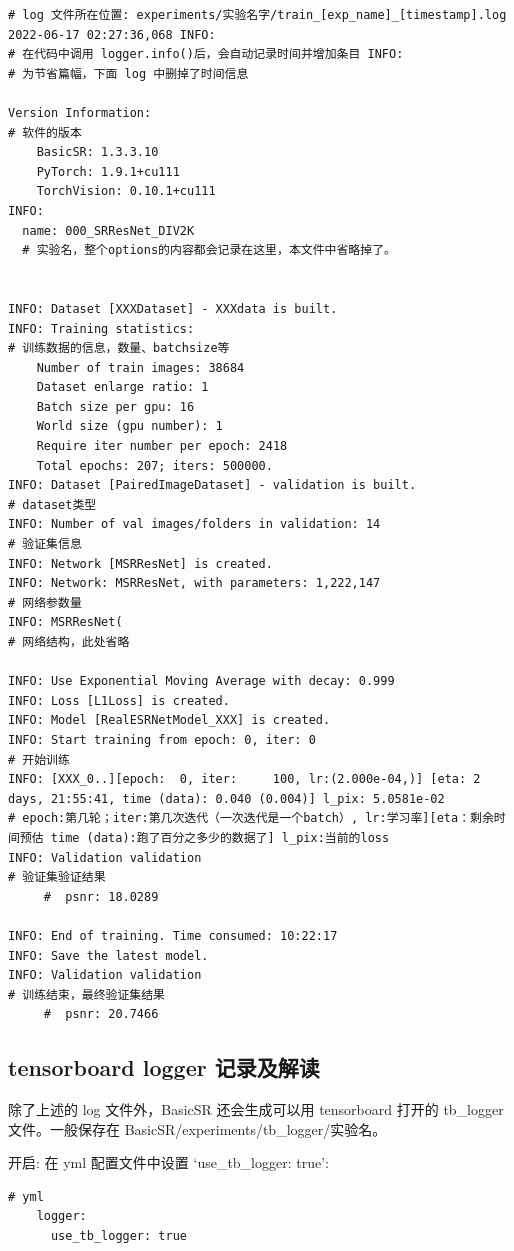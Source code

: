 \documentclass[../main.tex]{subfiles}
\begin{document}
\begin{verbatim}
# log 文件所在位置: experiments/实验名字/train_[exp_name]_[timestamp].log
2022-06-17 02:27:36,068 INFO:
# 在代码中调用 logger.info()后，会自动记录时间并增加条目 INFO:
# 为节省篇幅，下面 log 中删掉了时间信息

Version Information:
# 软件的版本
    BasicSR: 1.3.3.10
    PyTorch: 1.9.1+cu111
    TorchVision: 0.10.1+cu111
INFO:
  name: 000_SRResNet_DIV2K
  # 实验名，整个options的内容都会记录在这里，本文件中省略掉了。


INFO: Dataset [XXXDataset] - XXXdata is built.
INFO: Training statistics:
# 训练数据的信息，数量、batchsize等
    Number of train images: 38684
    Dataset enlarge ratio: 1
    Batch size per gpu: 16
    World size (gpu number): 1
    Require iter number per epoch: 2418
    Total epochs: 207; iters: 500000.
INFO: Dataset [PairedImageDataset] - validation is built.
# dataset类型
INFO: Number of val images/folders in validation: 14
# 验证集信息
INFO: Network [MSRResNet] is created.
INFO: Network: MSRResNet, with parameters: 1,222,147
# 网络参数量
INFO: MSRResNet(
# 网络结构，此处省略

INFO: Use Exponential Moving Average with decay: 0.999
INFO: Loss [L1Loss] is created.
INFO: Model [RealESRNetModel_XXX] is created.
INFO: Start training from epoch: 0, iter: 0
# 开始训练
INFO: [XXX_0..][epoch:  0, iter:     100, lr:(2.000e-04,)] [eta: 2 days, 21:55:41, time (data): 0.040 (0.004)] l_pix: 5.0581e-02
# epoch:第几轮；iter:第几次迭代（一次迭代是一个batch）, lr:学习率][eta：剩余时间预估 time (data):跑了百分之多少的数据了] l_pix:当前的loss
INFO: Validation validation
# 验证集验证结果
     #  psnr: 18.0289

INFO: End of training. Time consumed: 10:22:17
INFO: Save the latest model.
INFO: Validation validation
# 训练结束，最终验证集结果
     #  psnr: 20.7466
\end{verbatim}

\subsection{tensorboard logger 记录及解读}

除了上述的 log 文件外，BasicSR 还会生成可以用 tensorboard 打开的 tb\_logger 文件。一般保存在 BasicSR/experiments/tb\_logger/实验名。


开启: 在 yml 配置文件中设置 `use\_tb\_logger: true':
\begin{verbatim}
# yml
    logger:
      use_tb_logger: true
\end{verbatim}
\end{document}
